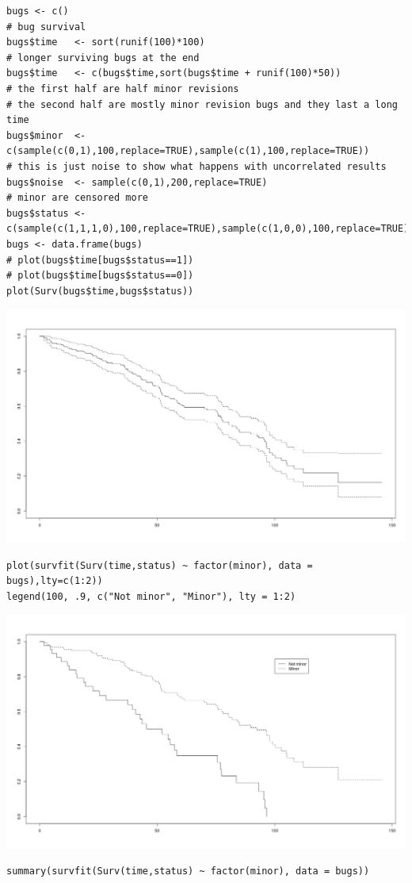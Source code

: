 \documentclass[11pt]{article}
\begin{document}
\begin{verbatim}
bugs <- c()
# bug survival
bugs$time   <- sort(runif(100)*100)
# longer surviving bugs at the end
bugs$time   <- c(bugs$time,sort(bugs$time + runif(100)*50))
# the first half are half minor revisions
# the second half are mostly minor revision bugs and they last a long time
bugs$minor  <- c(sample(c(0,1),100,replace=TRUE),sample(c(1),100,replace=TRUE))
# this is just noise to show what happens with uncorrelated results
bugs$noise  <- sample(c(0,1),200,replace=TRUE)
# minor are censored more
bugs$status <- c(sample(c(1,1,1,0),100,replace=TRUE),sample(c(1,0,0),100,replace=TRUE))
bugs <- data.frame(bugs)
# plot(bugs$time[bugs$status==1])
# plot(bugs$time[bugs$status==0])
plot(Surv(bugs$time,bugs$status))
\end{verbatim}

\begin{center}
\includegraphics[width=.9\linewidth]{RandBugs.png}
\end{center}
\begin{verbatim}
plot(survfit(Surv(time,status) ~ factor(minor), data = bugs),lty=c(1:2))
legend(100, .9, c("Not minor", "Minor"), lty = 1:2)
\end{verbatim}

\begin{center}
\includegraphics[width=.9\linewidth]{SurvFitRandBugs.png}
\end{center}
\begin{verbatim}
summary(survfit(Surv(time,status) ~ factor(minor), data = bugs))
\end{verbatim}
\end{document}
